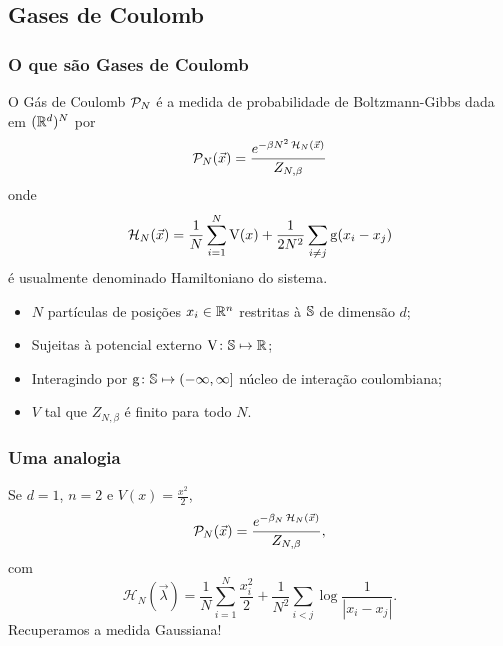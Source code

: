 
\subsection{Gases de Coulomb}
\begin{frame}
	\frametitle{O que são Gases de Coulomb}
	O Gás de Coulomb $\mathcal{P}_N$ é a medida de probabilidade de Boltzmann-Gibbs dada em $(\mathbb{R}^d)^N$ por
	\[
		\mathcal{P}_N(\vec{x}) = \frac{e^{-\beta N^2 \operatorname{\mathcal{H}}_N(\vec{x})}}{Z_{N,\beta}}
	\] 
	onde 
	\[
		\operatorname{\mathcal{H}}_N(\vec{x}) = \frac{1}{N} \sum_{i = 1}^{N} \operatorname{V}(x) + \frac{1}{2N^2} \sum_{i \neq j} \operatorname{g}(x_i - x_j)
	\]
	é usualmente denominado Hamiltoniano do sistema.
\end{frame}
\begin{frame}
	\begin{itemize}
	\item $N$ partículas de posições $x_i \in \mathbb{R}^n$ restritas à $\mathbb{S}$ de dimensão $d$;
	\item Sujeitas à potencial externo $\operatorname{V} \colon \mathbb{S} \mapsto \mathbb{R}$;
	\item Interagindo por $\operatorname{g} \colon \mathbb{S} \mapsto (-\infty, \infty]$ núcleo de interação coulombiana;
	\item $V$ tal que  $Z_{N, \beta}$ é finito para todo $N$.
	\end{itemize}
\end{frame}
\begin{frame}
	\frametitle{Uma analogia}	
	Se $d = 1$, $n=2$ e $V(x) = \frac{x^2}{2}$,
	\[
	\mathcal{P}_N(\vec{x}) = \frac{e^{-\beta_N \operatorname{\mathcal{H}}_N(\vec{x})}}{Z_{N,\beta}},
	\]
	com 
	\[
	\mathcal{H}_N(\vec{\lambda}) = \frac{1}{N}\sum_{i = 1}^{N} \frac{x_i^2}{2} + \frac{1}{N^2} \sum_{i < j} \log{\frac{1}{|x_i - x_j|}}.
	\]
	Recuperamos a medida Gaussiana!
\end{frame}

